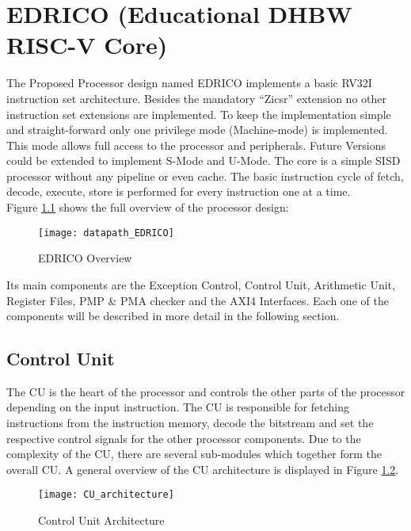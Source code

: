 
\chapter{EDRICO (Educational DHBW RISC-V Core)}

The Proposed Processor design named EDRICO implements a basic RV32I
instruction set architecture. Besides the mandatory “Zicsr” extension no other
instruction set extensions are implemented. To keep the implementation simple and
straight-forward only one privilege mode (Machine-mode) is implemented. This mode
allows full access to the processor and peripherals. Future Versions could be
extended to implement S-Mode and U-Mode.
The core is a simple \acf{SISD} processor without any pipeline or even cache. The basic
instruction cycle of fetch, decode, execute, store is performed for every instruction
one at a time.\\
Figure \ref{fig:edricooverview} shows the full overview of the processor design:

\begin{figure}[H]
	\centering
	\texttt{[image: datapath\_EDRICO]}
	\caption{EDRICO Overview}
	\label{fig:edricooverview}
\end{figure}

Its main components are the Exception Control, Control Unit, Arithmetic Unit,
Register Files, PMP \& PMA checker and the AXI4 Interfaces.
Each one of the components will be described in more detail in the following section.

\section{Control Unit}
The \ac{CU} is the heart of the processor and controls the other parts of the processor depending on the input instruction. The CU is responsible for fetching instructions from the instruction memory, decode the bitstream and set the respective control signals for the other processor components. Due to the complexity of the CU, there are several sub-modules which together form the overall CU.
A general overview of the CU architecture is displayed in Figure \ref{fig:cuarchitecture}. 

\begin{figure}[H]
	\centering
	\texttt{[image: CU\_architecture]}
	\caption{Control Unit Architecture}
	\label{fig:cuarchitecture}
\end{figure}

